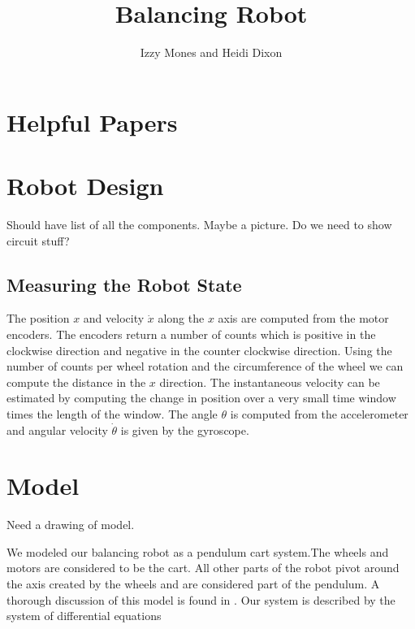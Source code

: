 \documentclass[]{article}
\title{Balancing Robot}
\author{Izzy Mones and Heidi Dixon}
\begin{document}
	\maketitle
\section{Helpful Papers}
\cite{nature_paper}
\cite{two_var_system}
 \cite{brunton}
 \cite{mitcode}
 
\section*{Robot Design}
Should have list of all the components. Maybe a picture. Do we need to show circuit stuff?

\subsection*{Measuring the Robot State}
The position $x$ and velocity $\dot{x}$ along the $x$ axis are computed from the motor encoders. The encoders return a number of counts which is positive in the clockwise direction and negative in the counter clockwise direction. Using the number of counts per wheel rotation and the circumference of the wheel we can compute the distance in the $x$ direction. The instantaneous velocity can be estimated by computing the change in position over a very small time window times the length of the window. The angle $\theta$ is computed from the accelerometer and angular velocity $\dot{\theta}$ is given by the gyroscope.

\section*{Model}
Need a drawing of model.

We modeled our balancing robot as a pendulum cart system.The wheels and motors are considered to be the cart.  All other parts of the robot pivot around the axis created by the wheels and are considered part of the pendulum.  A thorough discussion of this model is found in \cite{brunton}.  Our system is described by the system of differential equations
\end{document}
